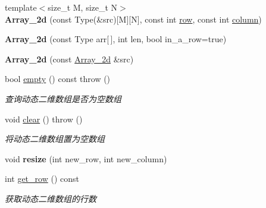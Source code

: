 \begin{DoxyCompactItemize}
\item 
\mbox{\label{classarray__2d_1_1_array__2d_ae7bbc97860822dbdc333d61c92c3e111}} 
{\footnotesize template$<$size\+\_\+t M, size\+\_\+t N$>$ }\\{\bfseries Array\+\_\+2d} (const Type(\&src)\mbox{[}M\mbox{]}\mbox{[}N\mbox{]}, const int \hyperlink{classarray__2d_1_1_array__2d_a17b90b53a8e0002452e96c2b7f74820b}{row}, const int \hyperlink{classarray__2d_1_1_array__2d_abdf56a1c0f22088353d9a32de9680d76}{column})
\item 
\mbox{\label{classarray__2d_1_1_array__2d_abeeaa67b7ad1287747e154e78a5720d5}} 
{\bfseries Array\+\_\+2d} (const Type arr\mbox{[}$\,$\mbox{]}, int len, bool in\+\_\+a\+\_\+row=true)
\item 
\mbox{\label{classarray__2d_1_1_array__2d_a82566af7cfdef956f9b6029321f6ee00}} 
{\bfseries Array\+\_\+2d} (const \hyperlink{classarray__2d_1_1_array__2d}{Array\+\_\+2d} \&src)
\item 
bool \hyperlink{classarray__2d_1_1_array__2d_a5c22f2f9e9c2aa9436aecb14dab6b27d}{empty} () const  throw ()
\begin{DoxyCompactList}\small\item\em 查询动态二维数组是否为空数组 \end{DoxyCompactList}\item 
\mbox{\label{classarray__2d_1_1_array__2d_aa72a614483a59ce37170c4b5bc75b1b1}} 
void \hyperlink{classarray__2d_1_1_array__2d_aa72a614483a59ce37170c4b5bc75b1b1}{clear} ()  throw ()
\begin{DoxyCompactList}\small\item\em 将动态二维数组置为空数组 \end{DoxyCompactList}\item 
\mbox{\label{classarray__2d_1_1_array__2d_afcb670f03ddb8b39e9fb8d6120bf736b}} 
void {\bfseries resize} (int new\+\_\+row, int new\+\_\+column)
\item 
int \hyperlink{classarray__2d_1_1_array__2d_aa2ac561244188718d0c1ee14568b772e}{get\+\_\+row} () const
\begin{DoxyCompactList}\small\item\em 获取动态二维数组的行数 \end{DoxyCompactList}\item 

\end{DoxyCompactItemize}

